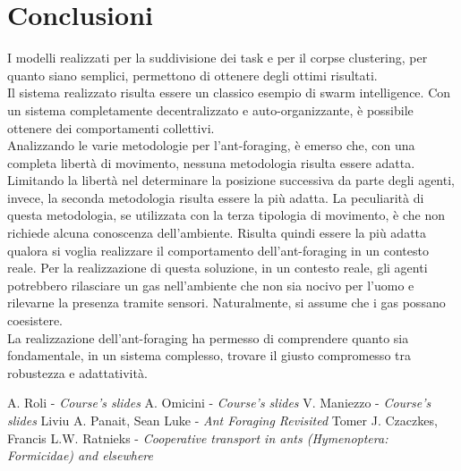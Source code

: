 \documentclass[12pt,a4paper,openright,twoside]{report}
\begin{document}
\clearpage{\pagestyle{empty}\cleardoublepage}
\chapter{Conclusioni}                %
\lhead[\fancyplain{}{\bfseries\thepage}]{\fancyplain{}{\bfseries\rightmark}}

I modelli realizzati per la suddivisione dei task e per il corpse clustering, per quanto siano semplici, permettono di ottenere degli ottimi risultati.\\
Il sistema realizzato risulta essere un classico esempio di swarm intelligence. Con un sistema completamente decentralizzato e auto-organizzante, è possibile ottenere dei comportamenti collettivi.\\
Analizzando le varie metodologie per l'ant-foraging, è emerso che, con una completa libertà di movimento, nessuna metodologia risulta essere adatta. Limitando la libertà nel determinare la posizione successiva da parte degli agenti, invece, la seconda metodologia risulta essere la più adatta. La peculiarità di questa metodologia, se utilizzata con la terza tipologia di movimento, è che non richiede alcuna conoscenza dell'ambiente. Risulta quindi essere la più adatta qualora si voglia realizzare il comportamento dell'ant-foraging in un contesto reale. Per la realizzazione di questa soluzione, in un contesto reale, gli agenti potrebbero rilasciare un gas nell'ambiente che non sia nocivo per l'uomo e rilevarne la presenza tramite sensori. Naturalmente, si assume che i gas possano coesistere.\\
La realizzazione dell'ant-foraging ha permesso di comprendere quanto sia fondamentale, in un sistema complesso, trovare il giusto compromesso tra robustezza e adattatività.\\

	\clearpage{\pagestyle{empty}\cleardoublepage}
	\begin{thebibliography}{90}             %
		\rhead[\fancyplain{}{\bfseries \leftmark}]{\fancyplain{}{\bfseries
				\thepage}}
		 A. Roli - \textit{Course's slides}
		 A. Omicini - \textit{Course's slides}  
		 V. Maniezzo - \textit{Course's slides}  
		 Liviu A. Panait, Sean Luke - \textit{Ant Foraging Revisited}
		 Tomer J. Czaczkes, Francis L.W. Ratnieks - \textit{Cooperative transport in ants (Hymenoptera: Formicidae) and elsewhere}
	\end{thebibliography}
\end{document}
